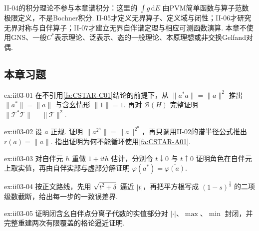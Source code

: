 \begin{FAWarning}[后续边界]
II-04的积分理论不参与本章谱积分：这里的 \(\displaystyle\int g\,\mathrm{d}E\) 由PVM简单函数与算子范数极限定义，不是Bochner积分. II-05才定义无界算子、定义域与闭性；II-06才研究无界对称与自伴算子；II-07才建立无界自伴谱定理与相应可测函数演算. 本章不使用GNS、一般\(\displaystyle C^*\)表示理论、泛表示、态的一般理论、本原理想或非交换Gelfand对偶.
\end{FAWarning}

\subsection*{本章习题}\label{sec:ii03-exercises}

\begin{FAExercise}{ex:ii03-01}
在不引用\autoref{fa:CSTAR-C01}结论的前提下，从 \(\displaystyle\|a^*a\|=\|a\|^2\) 推出 \(\displaystyle\|a^*\|=\|a\|\) 与含幺情形 \(\displaystyle\|1\|=1\). 再对 \(\displaystyle\mathcal B(H)\) 完整证明 \(\displaystyle\|\mathcal T^*\mathcal T\|=\|\mathcal T\|^2\).
\end{FAExercise}

\begin{FAExercise}[正规元谱半径]{ex:ii03-02}
设 \(\displaystyle a\) 正规. 证明 \(\displaystyle\|a^{2^n}\|=\|a\|^{2^n}\)，再只调用II-02的谱半径公式推出 \(\displaystyle r(a)=\|a\|\). 指出证明为何不能循环使用\autoref{fa:CSTAR-A01}.
\end{FAExercise}

\begin{FAExercise}[角色保持对合]{ex:ii03-03}
对自伴元 \(\displaystyle h\) 重做 \(\displaystyle1+\mathrm{i}th\) 估计，分别令 \(\displaystyle t\downarrow0\) 与 \(\displaystyle t\uparrow0\) 证明角色在自伴元上取实值，再由自伴实部与虚部分解证明 \(\displaystyle\varphi(a^*)=\overline{\varphi(a)}\).
\end{FAExercise}

\begin{FAExercise}[绝对值的多项式逼近]{ex:ii03-04}
按正文路线，先用 \(\displaystyle\sqrt{t^2+\delta}\) 逼近 \(\displaystyle|t|\)，再把平方根写成 \(\displaystyle(1-s)^{\frac{1}{2}}\) 的二项级数截断，给出每一步的一致误差界.
\end{FAExercise}

\begin{FAExercise}{ex:ii03-05}
证明闭含幺自伴点分离子代数的实值部分对 \(\displaystyle|\cdot|\)、\(\displaystyle\max\)、\(\displaystyle\min\) 封闭，并完整重建两次有限覆盖的格论逼近证明.
\end{FAExercise}

